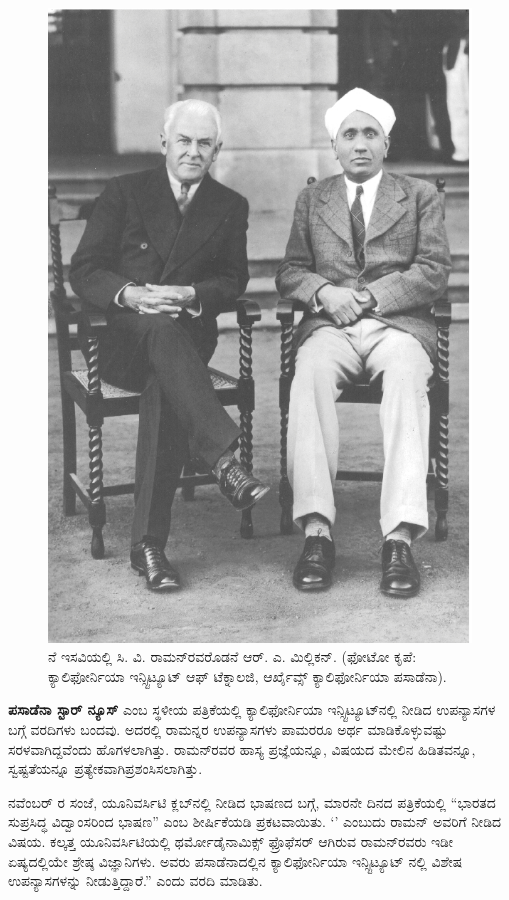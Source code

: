 \begin{figure}[!h]
\includegraphics[scale=0.29]{"images/4.jpg"}
\caption{ನೆ ಇಸವಿಯಲ್ಲಿ ಸಿ. ವಿ. ರಾಮನ್‍ರವರೊಡನೆ ಆರ್. ಎ. ಮಿಲ್ಲಿಕನ್. (ಫೋಟೋ ಕೃಪೆ: ಕ್ಯಾಲಿಫೋರ್ನಿಯಾ ಇನ್ಸ್ಟಿಟ್ಯೂಟ್ ಆಫ್ ಟೆಕ್ನಾಲಜಿ, ಆರ್ಖೈವ್ಸ್ ಕ್ಯಾಲಿಫೋರ್ನಿಯಾ ಪಸಾಡೆನಾ).}\label{chap1-fig05}
\end{figure}

\textbf{ಪಸಾಡೆನಾ ಸ್ಟಾರ್ ನ್ಯೂಸ್} ಎಂಬ ಸ್ಥಳೀಯ ಪತ್ರಿಕೆಯಲ್ಲಿ ಕ್ಯಾಲಿಫೋರ್ನಿಯಾ ಇನ್ಸ್ಟಿಟ್ಯೂಟ್‍ನಲ್ಲಿ ನೀಡಿದ ಉಪನ್ಯಾಸಗಳ ಬಗ್ಗೆ ವರದಿಗಳು ಬಂದವು. ಅದರಲ್ಲಿ ರಾಮನ್ನರ ಉಪನ್ಯಾಸಗಳು ಪಾಮರರೂ ಅರ್ಥ ಮಾಡಿಕೊಳ್ಳುವಷ್ಟು ಸರಳವಾಗಿದ್ದವೆಂದು ಹೊಗಳಲಾಗಿತ್ತು. ರಾಮನ್‍ರವರ ಹಾಸ್ಯ ಪ್ರಜ್ಞೆಯನ್ನೂ, ವಿಷಯದ ಮೇಲಿನ ಹಿಡಿತವನ್ನೂ, ಸ್ವಷ್ಟತೆಯನ್ನೂ ಪ್ರತ್ಯೇಕವಾಗಿ\break ಪ್ರಶಂಸಿಸಲಾಗಿತ್ತು.

 ನವೆಂಬರ್ ರ ಸಂಜೆ, ಯೂನಿವರ್ಸಿಟಿ ಕ್ಲಬ್‍ನಲ್ಲಿ ನೀಡಿದ ಭಾಷಣದ ಬಗ್ಗೆ, ಮಾರನೇ ದಿನದ ಪತ್ರಿಕೆಯಲ್ಲಿ “ಭಾರತದ ಸುಪ್ರಸಿದ್ಧ ವಿದ್ವಾಂಸರಿಂದ ಭಾಷಣ” ಎಂಬ ಶೀರ್ಷಿಕೆಯಡಿ ಪ್ರಕಟವಾಯಿತು. ‘\textit{}’ ಎಂಬುದು ರಾಮನ್ ಅವರಿಗೆ ನೀಡಿದ ವಿಷಯ. ಕಲ್ಕತ್ತ ಯೂನಿವರ್ಸಿಟಿಯಲ್ಲಿ ಥರ್ಮೋಡೈನಾಮಿಕ್ಸ್ ಫ್ರೊಫೆಸರ್ ಆಗಿರುವ ರಾಮನ್‍ರವರು ಇಡೀ ಏಷ್ಯದಲ್ಲಿಯೇ ಶ್ರೇಷ್ಠ ವಿಜ್ಞಾನಿಗಳು. ಅವರು ಪಸಾಡೆನಾದಲ್ಲಿನ ಕ್ಯಾಲಿಫೋರ್ನಿಯಾ ಇನ್ಸ್ಟಿಟ್ಯೂಟ್ ನಲ್ಲಿ ವಿಶೇಷ ಉಪನ್ಯಾಸಗಳನ್ನು ನೀಡುತ್ತಿದ್ದಾರೆ.” ಎಂದು ವರದಿ ಮಾಡಿತು.

